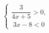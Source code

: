\begin{ex}[type=ineq_system]
	\begin{condition}
		$\begin{cases} \dfrac{3}{4x+ 5}>0 ,\\
			\; 3x - 8<0  
		\end{cases}$
	\end{condition}
\end{ex}